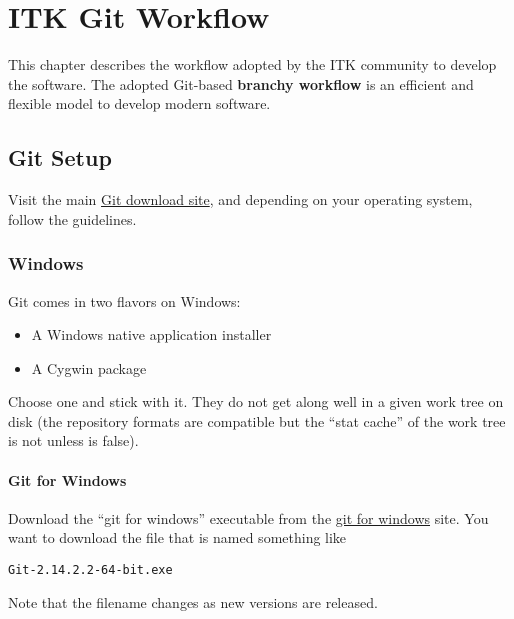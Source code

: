 \chapter{ITK Git Workflow}
\label{ch:ITKGitWorkflow}

This chapter describes the workflow adopted by the ITK community to develop
the software. The adopted Git-based \textbf{branchy workflow} is an efficient
and flexible model to develop modern software.


\section{Git Setup}
\label{sec:Git Setup}

Visit the main \href{https://www.git-scm.com/download}{Git download site}, and
depending on your operating system, follow the guidelines.


\subsection{Windows}
\label{subsec:Windows}

Git comes in two flavors on Windows:

\begin{itemize}
\item A Windows native application installer
\item A Cygwin package
\end{itemize}

Choose one and stick with it. They do not get along well in a given work tree
on disk (the repository formats are compatible but the ``stat cache'' of the
work tree is not unless  is false).


\subsubsection{Git for Windows}
\label{subsubsec:GitForWindows}

Download the ``git for windows'' executable from the
\href{https://git-for-windows.github.io/}{git for windows} site. You want to
download the file that is named something like

\begin{verbatim}
Git-2.14.2.2-64-bit.exe
\end{verbatim}

Note that the filename changes as new versions are released.

